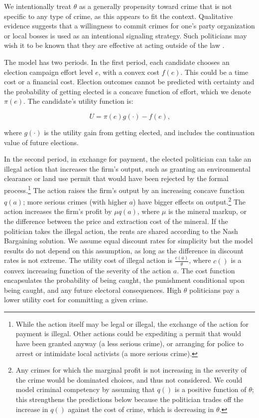 We intentionally treat $\theta$ as a generally propensity toward crime
that is not specific to any type of crime, as this appears to fit the
context. Qualitative evidence suggests that a willingness to commit
crimes for one's party organization or local bosses is used as an
intentional signaling strategy. Such politicians may wish it to be
known that they are effective at acting outside of the law
\cite{Witsoe2009a,Berenschot2011a,Vaishnav2017}.

The model has two periods. In the first period, each candidate
chooses an election campaign effort level $e$, with a convex cost
$f(e)$. This could be a time cost or a financial cost. Election
outcomes cannot be predicted with certainty and the probability of
getting elected is a concave function of effort, which we denote
$\pi(e)$. The candidate's utility function is:

\begin{equation}
U = \pi(e)g(\cdot) - f(e)\text{,}
\end{equation}

\noindent where $g(\cdot)$ is the utility gain from getting
elected, and includes the continuation value of future elections.

In the second period, in exchange for payment, the elected politician
can take an illegal action that increases the firm's output, such as
granting an environmental clearance or land use permit that would have
been rejected by the formal process.\footnote{While the action itself
  may be legal or illegal, the exchange of the action for payment is
  illegal. Other actions could be expediting a permit that would have
  been granted anyway (a less serious crime), or arranging for police
  to arrest or intimidate local activists (a more serious crime).}
The action raises the firm's output by an increasing concave function
$q(a)$; more serious crimes (with higher $a$) have bigger effects on
output.\footnote{Any crimes for which the marginal profit is not
  increasing in the severity of the crime would be dominated choices,
  and thus not considered. We could model criminal competency by
  assuming that $q()$ is a positive function of $\theta$; this
  strengthens the predictions below because the politician trades off
  the increase in $q()$ against the cost of crime, which is decreasing
  in $\theta$.}  The action increases the firm's profit by $\mu q(a)$,
where $\mu$ is the mineral markup, or the difference between the price
and extraction cost of the mineral. If the politician takes the
illegal action, the rents are shared according to the Nash Bargaining
solution. We assume equal discount rates for simplicity but the model
results do not depend on this assumption, as long as the difference in
discount rates is not extreme.  The utility cost of illegal action is
$\frac{c(a)}{\theta}$, where $c()$ is a convex increasing function of
the severity of the action $a$.  The cost function encapsulates the
probability of being caught, the punishment conditional upon being
caught, and any future electoral consequences. High $\theta$
politicians pay a lower utility cost for committing a given crime.


